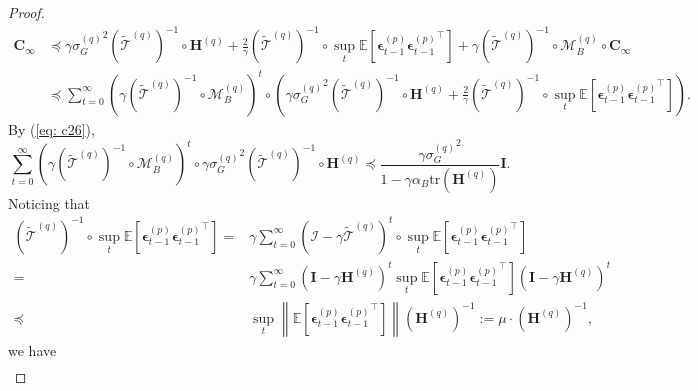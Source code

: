 \documentclass[11pt, letterpaper]{article}
\begin{document}
\begin{proof}
\begin{equation}
    \label{eq: f4}
    \begin{aligned}
        \mathbf{C}_\infty& \preceq \gamma{\sigma_G^{(q)}}^2(\widetilde{\mathcal{T}}^{(q)})^{-1}\circ\mathbf{H}^{(q)}+\frac{2}{\gamma}(\widetilde{\mathcal{T}}^{(q)})^{-1}\circ\sup_t\mathbb{E}\left[\boldsymbol{\epsilon}_{t-1}^{(p)}{\boldsymbol{\epsilon}_{t-1}^{(p)}}^\top\right]+\gamma(\widetilde{\mathcal{T}}^{(q)})^{-1}\circ\mathcal{M}_B^{(q)}\circ\mathbf{C}_\infty\\
        & \preceq\sum_{t=0}^\infty\left(\gamma(\widetilde{\mathcal{T}}^{(q)})^{-1}\circ\mathcal{M}_B^{(q)}\right)^t\circ\left(\gamma{\sigma_G^{(q)}}^2(\widetilde{\mathcal{T}}^{(q)})^{-1}\circ\mathbf{H}^{(q)}+\frac{2}{\gamma}(\widetilde{\mathcal{T}}^{(q)})^{-1}\circ\sup_t\mathbb{E}\left[\boldsymbol{\epsilon}_{t-1}^{(p)}{\boldsymbol{\epsilon}_{t-1}^{(p)}}^\top\right]\right).
    \end{aligned}
\end{equation}
By (\ref{eq: c26}),
\begin{equation}
    \label{eq: f5}
    \sum_{t=0}^\infty\left(\gamma(\widetilde{\mathcal{T}}^{(q)})^{-1}\circ\mathcal{M}_B^{(q)}\right)^t\circ\gamma{\sigma_G^{(q)}}^2(\widetilde{\mathcal{T}}^{(q)})^{-1}\circ\mathbf{H}^{(q)}\preceq \frac{\gamma{\sigma_G^{(q)}}^2}{1-\gamma\alpha_B\mathrm{tr}(\mathbf{H}^{(q)})}\mathbf{I}.
\end{equation}
Noticing that
\begin{equation*}
    \begin{aligned}
        (\widetilde{\mathcal{T}}^{(q)})^{-1}\circ\sup_t\mathbb{E}\left[\boldsymbol{\epsilon}_{t-1}^{(p)}{\boldsymbol{\epsilon}_{t-1}^{(p)}}^\top\right]=&\gamma\sum_{t=0}^\infty(\mathcal{I}-\gamma\widetilde{\mathcal{T}}^{(q)})^t\circ\sup_t\mathbb{E}\left[\boldsymbol{\epsilon}_{t-1}^{(p)}{\boldsymbol{\epsilon}_{t-1}^{(p)}}^\top\right] \\
        =&\gamma\sum_{t=0}^\infty(\mathbf{I}-\gamma\mathbf{H}^{(q)})^t\sup_t\mathbb{E}\left[\boldsymbol{\epsilon}_{t-1}^{(p)}{\boldsymbol{\epsilon}_{t-1}^{(p)}}^\top\right](\mathbf{I}- \gamma\mathbf{H}^{(q)})^t \\
        \preceq& \sup_t\left\|\mathbb{E}\left[\boldsymbol{\epsilon}_{t-1}^{(p)}{\boldsymbol{\epsilon}_{t-1}^{(p)}}^\top\right]\right\| (\mathbf{H}^{(q)})^{-1}:=\mu\cdot(\mathbf{H}^{(q)})^{-1},
    \end{aligned}
\end{equation*}
we have
\begin{equation}
    \label{eq: f6}
    \begin{aligned}

\end{aligned}
\end{equation}
\end{proof}
\end{document}
